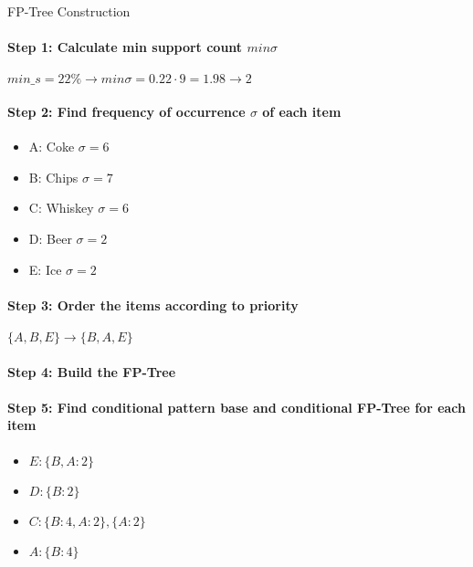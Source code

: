 \begin{KR}{FP-Tree Construction}\\
\paragraph{Step 1: Calculate min support count $min\sigma$}
$min\_s = 22\% \rightarrow min\sigma = 0.22 \cdot 9 = 1.98 \rightarrow 2$

\paragraph{Step 2: Find frequency of occurrence $\sigma$ of each item}
\begin{itemize}
    \item A: Coke $\sigma = 6$
    \item B: Chips $\sigma = 7$
    \item C: Whiskey $\sigma = 6$
    \item D: Beer $\sigma = 2$
    \item E: Ice $\sigma = 2$
\end{itemize}

\paragraph{Step 3: Order the items according to priority}
$\{A, B, E\} \rightarrow \{B, A, E\}$

\paragraph{Step 4: Build the FP-Tree}

\paragraph{Step 5: Find conditional pattern base and conditional FP-Tree for each item}
\begin{itemize}
    \item $E: \{B, A: 2\}$
    \item $D: \{B: 2\}$
    \item $C: \{B: 4, A: 2\}, \{A: 2\}$
    \item $A: \{B: 4\}$
\end{itemize}
\end{KR}

